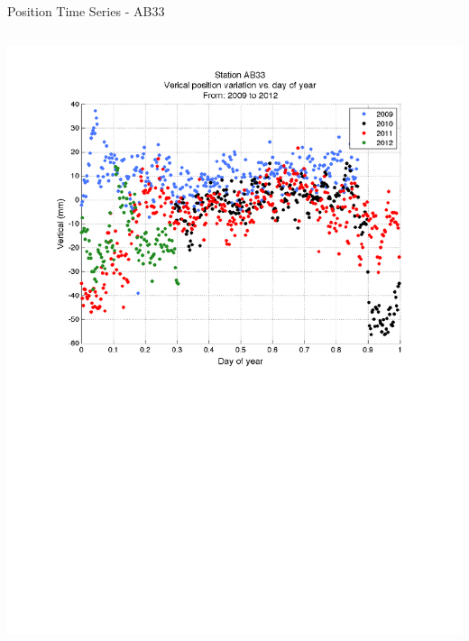 \documentclass{beamer}
\begin{document}
\begin{frame}{Position Time Series - AB33}
\begin{columns}
\includegraphics[width=1\linewidth,trim=70 300 70 50, clip=true]{logan/ab33_pos_byYear.pdf}
\end{columns}
\end{frame}
\end{document}
